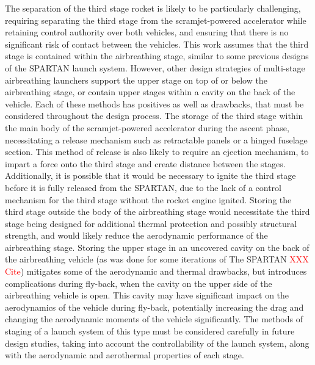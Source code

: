 The separation of the third stage rocket is likely to be particularly challenging, requiring separating the third stage from the scramjet-powered accelerator while retaining control authority over both vehicles, and ensuring that there is no significant risk of contact between the vehicles. This work assumes that the third stage is contained within the airbreathing stage, similar to some previous designs of the SPARTAN launch system\cite{Jazra2013}. However, other design strategies of multi-stage airbreathing launchers support the upper stage on top of\cite{Gong2014,Tsuchiya2005} or below\cite{Takahashi1997} the airbreathing stage, or contain upper stages within a cavity on the back of the vehicle\cite{Preller2017b,Mehta2001,Wilhite1991}. Each of these methods has positives as well as drawbacks, that must be considered throughout the design process.
The storage of the third stage within the main body of the scramjet-powered accelerator during the ascent phase, necessitating a release mechanism such as retractable panels or a hinged fuselage section. This method of release is also likely to require an ejection mechanism, to impart a force onto the third stage and create distance between the stages. Additionally, it is possible that it would be necessary to ignite the third stage before it is fully released from the SPARTAN, due to the lack of a control mechanism for the third stage without the rocket engine ignited. 
Storing the third stage outside the body of the airbreathing stage would necessitate the third stage being designed for additional thermal protection and possibly structural strength, and would likely reduce the aerodynamic performance of the airbreathing stage. Storing the upper stage in an uncovered cavity on the back of the airbreathing vehicle (as was done for some iterations of The SPARTAN \textcolor{red}{XXX Cite}) mitigates some of the aerodynamic and thermal drawbacks, but introduces complications during fly-back, when the cavity on the upper side of the airbreathing vehicle is open. This cavity may have significant impact on the aerodynamics of the vehicle during fly-back, potentially increasing the drag and changing the aerodynamic moments of the vehicle significantly. 
The methods of staging of a launch system of this type must be considered carefully in future design studies, taking into account the controllability of the launch system, along with the aerodynamic and aerothermal properties of each stage. 


